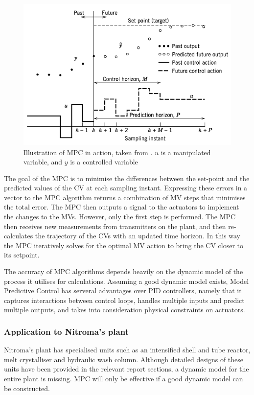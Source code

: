     \begin{figure}
        \centering
        \includegraphics[width=\linewidth]{chapters/4-operation-control/4-Figures/MPC-Seborg-2011.png}
        \caption{Illustration of MPC in action, taken from \textcite{}. $u$ is a manipulated variable, and $y$ is a controlled variable}
        \label{fig:MPC}
    \end{figure}

The goal of the MPC is to minimise the differences between the set-point and the predicted values of the CV at each sampling instant. Expressing these errors in a vector to the MPC algorithm returns a combination of MV steps that minimises the total error. The MPC then outputs a signal to the actuators to implement the changes to the MVs. However, only the first step is performed. The MPC then receives new measurements from transmitters on the plant, and then re-calculates the trajectory of the CVs with an updated time horizon. In this way the MPC iteratively solves for the optimal MV action to bring the CV closer to its setpoint. 

The accuracy of MPC algorithms depends heavily on the dynamic model of the process it utilises for calculations. Assuming a good dynamic model exists, Model Predictive Control has serveral advantages over PID controllers, namely that it captures interactions between control loops, handles multiple inputs and predict multiple outputs, and takes into consideration physical constraints on actuators. 

\subsubsection{Application to Nitroma's plant}
Nitroma's plant has specialised units such as an intensified shell and tube reactor, melt crystalliser and hydraulic wash column. Although detailed designs of these units have been provided in the relevant report sections, a dynamic model for the entire plant is missing. MPC will only be effective if a good dynamic model can be constructed. 

